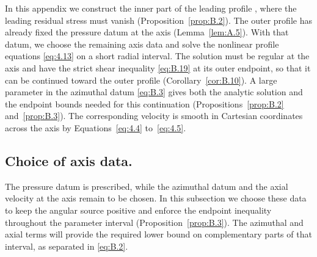 In this appendix we construct the inner part of the leading profile , where the leading residual
stress  must vanish (Proposition~\ref{prop:B.2}). The outer profile has already fixed the pressure datum
 at the axis (Lemma~\ref{lem:A.5}). With that datum, we choose the remaining axis data
 and solve the nonlinear profile equations \eqref{eq:4.13} on a short radial interval. The solution
must be regular at the axis and have the strict shear inequality \eqref{eq:B.19} at its outer endpoint, so that it can be
continued toward the outer profile (Corollary~\ref{cor:B.10}). A large parameter  in the azimuthal
datum \eqref{eq:B.3} gives both the analytic solution and the endpoint bounds needed for this continuation
(Propositions~\ref{prop:B.2} and~\ref{prop:B.3}). The corresponding velocity is smooth in Cartesian coordinates across the axis
by Equations~\eqref{eq:4.4} to~\eqref{eq:4.5}.

\subsection{Choice of axis data.}\label{sec:B.1}
The pressure datum  is prescribed, while the azimuthal datum
 and the axial velocity  at the axis remain to be chosen. In this
subsection we choose these data to keep the angular source  positive and enforce the endpoint inequality
throughout the parameter interval (Proposition~\ref{prop:B.3}). The azimuthal and axial terms will provide the required lower
bound on complementary parts of that interval, as separated in \eqref{eq:B.2}.

